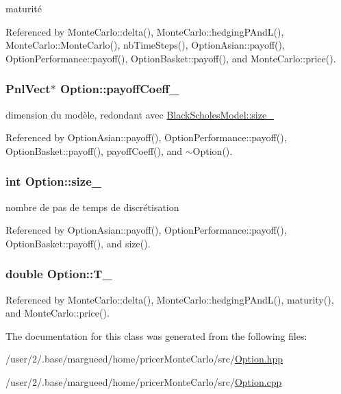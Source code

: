 maturité 



Referenced by Monte\-Carlo\-::delta(), Monte\-Carlo\-::hedging\-P\-And\-L(), Monte\-Carlo\-::\-Monte\-Carlo(), nb\-Time\-Steps(), Option\-Asian\-::payoff(), Option\-Performance\-::payoff(), Option\-Basket\-::payoff(), and Monte\-Carlo\-::price().

\hypertarget{classOption_ae39676c75e7c6592cfcead8abe48b71b}{
\subsubsection[{payoff\-Coeff\-\_\-}]{\setlength{\rightskip}{0pt plus 5cm}Pnl\-Vect$\ast$ Option\-::payoff\-Coeff\-\_\-}}\label{classOption_ae39676c75e7c6592cfcead8abe48b71b}


dimension du modèle, redondant avec \hyperlink{classBlackScholesModel_ab84e9318c0c1e8a50d5e2f9a70f1256e}{Black\-Scholes\-Model\-::size\-\_\-} 



Referenced by Option\-Asian\-::payoff(), Option\-Performance\-::payoff(), Option\-Basket\-::payoff(), payoff\-Coeff(), and $\sim$\-Option().

\hypertarget{classOption_a65fae5103b50f953f29a86b1a17b4540}{
\subsubsection[{size\-\_\-}]{\setlength{\rightskip}{0pt plus 5cm}int Option\-::size\-\_\-}}\label{classOption_a65fae5103b50f953f29a86b1a17b4540}


nombre de pas de temps de discrétisation 



Referenced by Option\-Asian\-::payoff(), Option\-Performance\-::payoff(), Option\-Basket\-::payoff(), and size().

\hypertarget{classOption_a89f0365b68626cc5eb523f12159e0764}{
\subsubsection[{T\-\_\-}]{\setlength{\rightskip}{0pt plus 5cm}double Option\-::\-T\-\_\-}}\label{classOption_a89f0365b68626cc5eb523f12159e0764}


Referenced by Monte\-Carlo\-::delta(), Monte\-Carlo\-::hedging\-P\-And\-L(), maturity(), and Monte\-Carlo\-::price().



The documentation for this class was generated from the following files\-:\begin{DoxyCompactItemize}
\item 
/user/2/.\-base/margueed/home/pricer\-Monte\-Carlo/src/\hyperlink{Option_8hpp}{Option.\-hpp}\item 
/user/2/.\-base/margueed/home/pricer\-Monte\-Carlo/src/\hyperlink{Option_8cpp}{Option.\-cpp}\end{DoxyCompactItemize}
